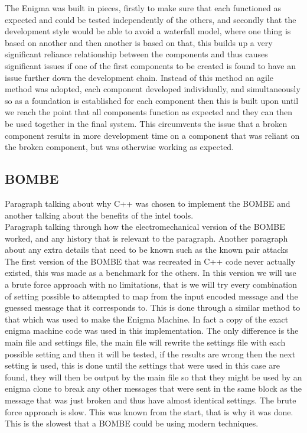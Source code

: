 \documentclass[12pt,a4paper]{article}
\begin{document}
The Enigma was built in pieces, firstly to make sure that each functioned as expected and could be tested independently of the others, and secondly that the development style would be able to avoid a waterfall model, where one thing is based on another and then another is based on that, this builds up a very significant reliance relationship between the components and thus causes significant issues if one of the first components to be created is found to have an issue further down the development chain. Instead of this method an agile method was adopted, each component developed individually, and simultaneously so as a foundation is established for each component then this is built upon until we reach the point that all components function as expected and they can then be used together in the final system. This circumvents the issue that a broken component results in more development time on a component that was reliant on the broken component, but was otherwise working as expected.

\subsection{BOMBE}

Paragraph talking about why C++ was chosen to implement the BOMBE and another talking about the benefits of the intel tools.\\

Paragraph talking through how the electromechanical version of the BOMBE worked, and any history that is relevant to the paragraph. Another paragraph about any extra details that need to be known such as the known pair attacks\\

The first version of the BOMBE that was recreated in C++ code never actually existed, this was made as a benchmark for the others. In this version we will use a brute force approach with no limitations, that is we will try every combination of setting possible to attempted to map from the input encoded message and the guessed message that it corresponds to. This is done through a similar method to that which was used to make the Enigma Machine. In fact a copy of the exact enigma machine code was used in this implementation. The only difference is the main file and settings file, the main file will rewrite the settings file with each possible setting and then it will be tested, if the results are wrong then the next setting is used, this is done until the settings that were used in this case are found, they will then be output by the main file so that they might be used by an enigma clone to break any other messages that were sent in the same block as the message that was just broken and thus have almost identical settings. The brute force approach is slow. This was known from the start, that is why it was done. This is the slowest that a BOMBE could be using modern techniques. 
\end{document}
